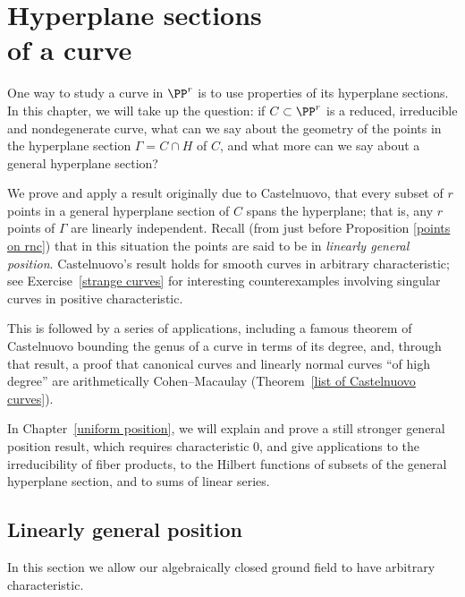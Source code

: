 


\chapter[Hyperplane sections of a curve]{Hyperplane sections\\of a curve}
\label{linear general position chapter}

One way to study a curve in $\PP^r$ is to use properties of its hyperplane
sections. In this chapter, we will take up the question: if $C \subset
\PP^r$ is a reduced, irreducible and nondegenerate curve, what can we say
about the geometry of the points in the  hyperplane section 
$\Gamma = C \cap H$ of $C$, and what more can we say about a general hyperplane
section?

We prove and apply a result originally due to Castelnuovo,
%
that every subset of $r$ points in a
general hyperplane section
%
of $C$ spans the hyperplane; that is, any $r$
points of $\Gamma$ are linearly independent. 
Recall (from just before Proposition \ref{points on rnc}) that
in this situation 
the points 
are said to be
in \emph{linearly general position}.
%
Castelnuovo's result
holds for smooth curves in 
arbitrary characteristic;
%
see
Exercise~\ref{strange curves} for
interesting counterexamples involving singular curves in positive
characteristic. 

This is followed by a series of applications,
including 
a
%
famous theorem of Castelnuovo bounding the genus of a
curve in terms of its degree,
and, through that result, a proof that canonical curves and linearly
normal curves ``of high degree'' are arithmetically Cohen--Macaulay
%
(Theorem~\ref{list of Castelnuovo curves}).

{\footnotesize  %
In Chapter~\ref{uniform position}, we will explain and prove a still
stronger general position result, which requires characteristic 0, and
give applications to the irreducibility of fiber products, to the Hilbert
functions of subsets of the
general hyperplane section, and to sums of linear series.

}

\section{Linearly general position}\label{linearly general position
section}
In this section we 
allow our algebraically closed ground field to
have arbitrary characteristic.

